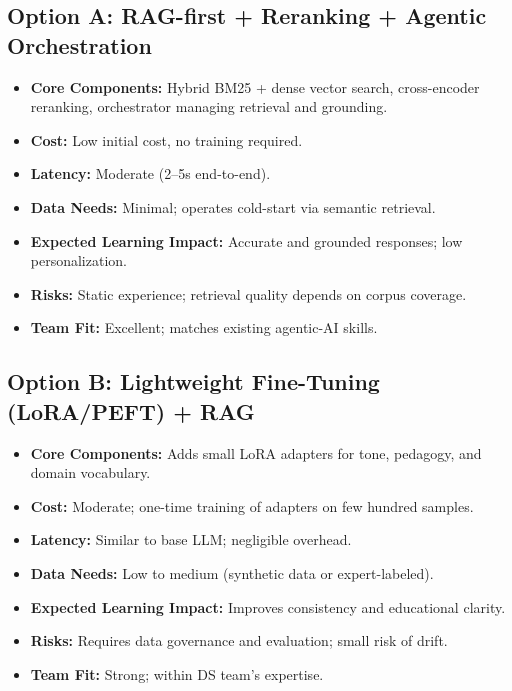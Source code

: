 \documentclass[12pt]{article}
\begin{document}
\subsection*{Option A: RAG-first + Reranking + Agentic Orchestration}
\begin{itemize}[leftmargin=1.2cm]
  \item \textbf{Core Components:} Hybrid BM25 + dense vector search, cross-encoder reranking, orchestrator managing retrieval and grounding.
  \item \textbf{Cost:} Low initial cost, no training required. 
  \item \textbf{Latency:} Moderate (2–5s end-to-end).
  \item \textbf{Data Needs:} Minimal; operates cold-start via semantic retrieval.
  \item \textbf{Expected Learning Impact:} Accurate and grounded responses; low personalization.
  \item \textbf{Risks:} Static experience; retrieval quality depends on corpus coverage.
  \item \textbf{Team Fit:} Excellent; matches existing agentic-AI skills.
\end{itemize}

\subsection*{Option B: Lightweight Fine-Tuning (LoRA/PEFT) + RAG}
\begin{itemize}[leftmargin=1.2cm]
  \item \textbf{Core Components:} Adds small LoRA adapters for tone, pedagogy, and domain vocabulary.
  \item \textbf{Cost:} Moderate; one-time training of adapters on few hundred samples.
  \item \textbf{Latency:} Similar to base LLM; negligible overhead.
  \item \textbf{Data Needs:} Low to medium (synthetic data or expert-labeled).
  \item \textbf{Expected Learning Impact:} Improves consistency and educational clarity.
  \item \textbf{Risks:} Requires data governance and evaluation; small risk of drift.
  \item \textbf{Team Fit:} Strong; within DS team’s expertise.
\end{itemize}
\end{document}
